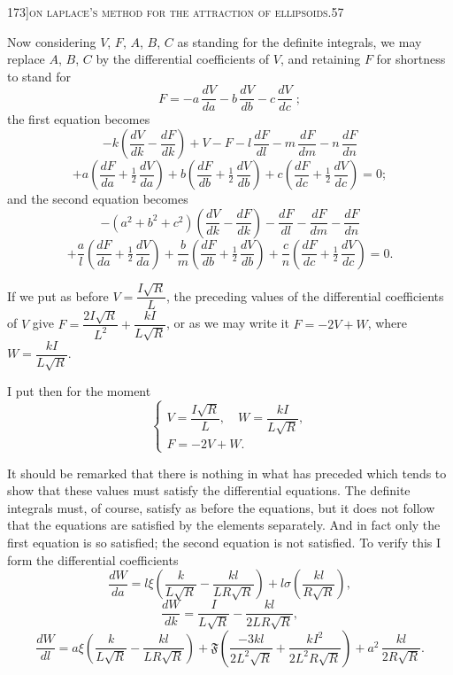 \documentclass[11pt]{article}
\begin{document}
\newpage

\begin{center}
\small 173]\hfill\textsc{on laplace's method for the attraction of ellipsoids.}\hfill\textsc{57}
\end{center}

\medskip

\noindent Now considering $V$, $F$, $A$, $B$, $C$ as standing for the definite integrals, we may
replace $A$, $B$, $C$ by the differential coefficients of $V$, and retaining $F$ for shortness to
stand for
\[
F = - a\,\frac{dV}{da} - b\,\frac{dV}{db} - c\,\frac{dV}{dc}\;;
\]
the first equation becomes
\[
- k\left(\frac{dV}{dk} - \frac{dF}{dk}\right) + V - F - l\,\frac{dF}{dl} - m\,\frac{dF}{dm} - n\,\frac{dF}{dn}
\]
\[
+ a\left(\frac{dF}{da} + \tfrac{1}{2}\,\frac{dV}{da}\right) + b\left(\frac{dF}{db} + \tfrac{1}{2}\,\frac{dV}{db}\right) + c\left(\frac{dF}{dc} + \tfrac{1}{2}\,\frac{dV}{dc}\right) = 0;
\]
and the second equation becomes
\[
- (a^{2} + b^{2} + c^{2})\left(\frac{dV}{dk} - \frac{dF}{dk}\right) - \frac{dF}{dl} - \frac{dF}{dm} - \frac{dF}{dn}
\]
\[
+ \frac{a}{l}\left(\frac{dF}{da} + \tfrac{1}{2}\,\frac{dV}{da}\right) + \frac{b}{m}\left(\frac{dF}{db} + \tfrac{1}{2}\,\frac{dV}{db}\right) + \frac{c}{n}\left(\frac{dF}{dc} + \tfrac{1}{2}\,\frac{dV}{dc}\right) = 0.
\]

If we put as before $V = \dfrac{I\sqrt{R}}{L}$, the preceding values of the differential coefficients
of $V$ give $F = \dfrac{2I\sqrt{R}}{L^{2}} + \dfrac{kI}{L\sqrt{R}}$, or as we may write it $F = -2V + W$, where $W = \dfrac{kI}{L\sqrt{R}}$.

I put then for the moment
\[
\left\{
\begin{array}{l}
V = \dfrac{I\sqrt{R}}{L},\quad W = \dfrac{kI}{L\sqrt{R}}, \\[6pt]
F = - 2V + W.
\end{array}
\right.
\]

It should be remarked that there is nothing in what has preceded which tends
to show that these values must satisfy the differential equations. The definite integrals
must, of course, satisfy as before the equations, but it does not follow that the equations
are satisfied by the elements separately. And in fact only the first equation is so
satisfied; the second equation is not satisfied. To verify this I form the differential
coefficients
\[
\frac{dW}{da} = l\xi\left(\frac{k}{L\sqrt{R}} - \frac{kl}{LR\sqrt{R}}\right) + l\sigma\left(\frac{kl}{R\sqrt{R}}\right),
\]
\[
\frac{dW}{dk} = \frac{I}{L\sqrt{R}} - \frac{kl}{2LR\sqrt{R}},
\]
\[
\frac{dW}{dl} = a\xi\left(\frac{k}{L\sqrt{R}} - \frac{kl}{LR\sqrt{R}}\right) + \mathfrak{F}\left(\frac{-3kl}{2L^{2}\sqrt{R}} + \frac{kI^{2}}{2L^{2}R\sqrt{R}}\right) + a^{2}\,\frac{kl}{2R\sqrt{R}}.
\]
\end{document}
